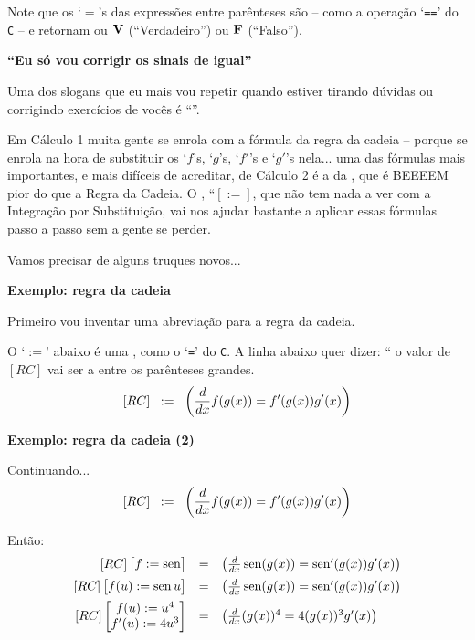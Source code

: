 \documentclass[oneside,12pt]{article}
\begin{document}
Note que os `$=$'s das expressões entre parênteses são
 -- como a operação `\texttt{==}' do \texttt{C}
-- e retornam ou $\mathbf{V}$ (``Verdadeiro'') ou $\mathbf{F}$ (``Falso'').

\newpage


{\bf ``Eu só vou corrigir os sinais de igual''}

Uma dos slogans que eu mais vou repetir quando estiver tirando dúvidas
ou corrigindo exercícios de vocês é ``''.

Em Cálculo 1 muita gente se enrola com a fórmula da regra da cadeia --
porque se enrola na hora de substituir os `$f$'s, `$g$'s, `$f'$'s e
`$g'$'s nela... uma das fórmulas mais importantes, e mais difíceis de
acreditar, de Cálculo 2 é a da ,
que é BEEEEM pior do que a Regra da Cadeia. O , ``$[:=]$, que não tem nada a ver com a Integração por
Substituição, vai nos ajudar bastante a aplicar essas fórmulas passo a
passo sem a gente se perder.

Vamos precisar de alguns truques novos...

\newpage


{\bf Exemplo: regra da cadeia}

Primeiro vou inventar uma abreviação para a regra da cadeia.


\msk

O `$:=$' abaixo é uma , como o `\texttt{=}' do
\texttt{C}. A linha abaixo quer dizer: ``
o valor de $[RC]$ vai ser a  entre os parênteses
grandes.
%
$$[RC] \;\; := \;\; \left( \frac{d}{dx} f(g(x)) = f'(g(x))g'(x) \right)$$

\newpage

{\bf Exemplo: regra da cadeia (2)}

Continuando...
%
$$[RC] \;\; := \;\; \left( \frac{d}{dx} f(g(x)) = f'(g(x))g'(x) \right)$$

Então:
%
$$\begin{array}{rcl}
  [RC] \left [\begin{matrix}f := \operatorname{sen}\end{matrix}\right ] &=&
     \left( \frac{d}{dx} \operatorname{sen}(g(x)) = \operatorname{sen}'(g(x))g'(x) \right) \\[5pt]
  [RC] \left [\begin{matrix}f(u) := \operatorname{sen} u\end{matrix}\right ] &=&
     \left( \frac{d}{dx} \operatorname{sen}(g(x)) = \operatorname{sen}'(g(x))g'(x) \right) \\[5pt]
  [RC] \left [\begin{matrix}f(u) := u^4 \\ f'(u) := 4u^3 \end{matrix}\right ] &=&
     \left( \frac{d}{dx} (g(x))^4 = 4(g(x))^3g'(x) \right) \\
  \end{array}
$$
\end{document}
